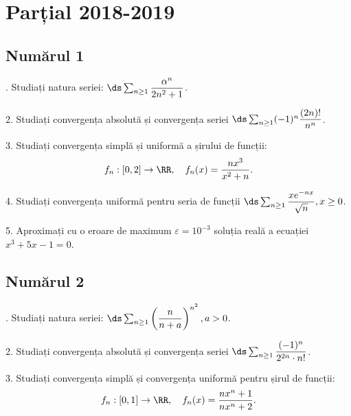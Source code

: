 
\chapter{Parțial 2018-2019}

\section{Numărul 1}

\indent{}. Studiați natura seriei:
$ \ds\sum_{n \geq 1} \dfrac{\alpha^n}{2n^2 + 1} $.

\vspace{1cm}

2. Studiați convergența absolută și convergența seriei
$ \ds\sum_{n \geq 1} (-1)^n \dfrac{(2n)!}{n^n} $.

\vspace{1cm}

3. Studiați convergența simplă și uniformă a șirului de funcții:
\[
  f_n : [0, 2] \to \RR, \quad f_n(x) = \dfrac{nx^3}{x^2 + n}.
\]

\vspace{1cm}

4. Studiați convergența uniformă pentru seria de funcții
$ \ds\sum_{n \geq 1} \dfrac{xe^{-nx}}{\sqrt{n}}, x \geq 0 $.

\vspace{1cm}

5. Aproximați cu o eroare de maximum $ \varepsilon = 10^{-3} $ soluția
reală a ecuației $ x^3 + 5x - 1 = 0 $.


\section{Numărul 2}

\indent{}. Studiați natura seriei:
$ \ds\sum_{n \geq 1} \left( \dfrac{n}{n+a} \right)^{n^2}, a > 0 $.

\vspace{1cm}

2. Studiați convergența absolută și convergența seriei
$ \ds\sum_{n \geq 1} \dfrac{(-1)^n}{2^{2n} \cdot n!} $.

\vspace{1cm}

3. Studiați convergența simplă și convergența uniformă pentru șirul de funcții:
\[
  f_n : [0, 1] \to \RR, \quad f_n(x) = \dfrac{nx^n + 1}{nx^n + 2}.
\]

